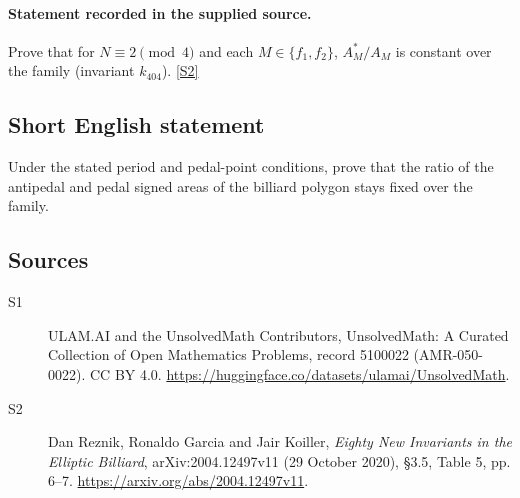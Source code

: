 \documentclass[11pt]{article}
\newcommand{\sref}[2]{\hyperlink{source:#1:#2}{[S#2]}}
\begin{document}
\paragraph{Statement recorded in the supplied source.}
Prove that for $N\equiv2\pmod4$ and each $M\in\{f_1,f_2\}$, $A_M^*/A_M$ is constant over the family (invariant $k_{404}$). \sref{5100022}{2}
\subsection{Short English statement}
Under the stated period and pedal-point conditions, prove that the ratio of the antipedal and pedal signed areas of the billiard polygon stays fixed over the family.
\subsection{Sources}
\begin{description}
\item[\hypertarget{source:5100022:1}{S1}] ULAM.AI and the UnsolvedMath Contributors, UnsolvedMath: A Curated Collection of Open Mathematics Problems, record 5100022 (AMR-050-0022). CC BY 4.0. \url{https://huggingface.co/datasets/ulamai/UnsolvedMath}.
\item[\hypertarget{source:5100022:2}{S2}] Dan Reznik, Ronaldo Garcia and Jair Koiller, \emph{Eighty New Invariants in the Elliptic Billiard}, arXiv:2004.12497v11 (29 October 2020), \S3.5, Table 5, pp. 6--7. \url{https://arxiv.org/abs/2004.12497v11}.
\end{description}
\label{end:5100022}
\end{document}
